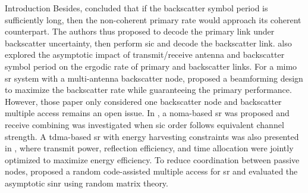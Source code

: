 \documentclass[journal]{IEEEtran}
\begin{document}
\begin{section}{Introduction}
	Besides, \cite{Long2020a} concluded that if the backscatter symbol period is sufficiently long, then the non-coherent primary rate would approach its coherent counterpart.
	The authors thus proposed to decode the primary link under backscatter uncertainty, then perform \gls{sic} and decode the backscatter link.
	\cite{Zhou2019a} also explored the asymptotic impact of transmit/receive antenna and backscatter symbol period on the ergodic rate of primary and backscatter links.
	For a \gls{mimo} \gls{sr} system with a multi-antenna backscatter node, \cite{Wu2021a} proposed a beamforming design to maximize the backscatter rate while guaranteeing the primary performance.
	However, those paper only considered one backscatter node and backscatter multiple access remains an open issue.
	In \cite{Xu2021a}, a \gls{noma}-based \gls{sr} was proposed and receive combining was investigated when \gls{sic} order follows equivalent channel strength.
	A \gls{tdma}-based \gls{sr} with energy harvesting constraints was also presented in \cite{Yang2021a}, where transmit power, reflection efficiency, and time allocation were jointly optimized to maximize energy efficiency.
	To reduce coordination between passive nodes, \cite{Han2021} proposed a random code-assisted multiple access for \gls{sr} and evaluated the asymptotic \gls{sinr} using random matrix theory.


\end{section}
\end{document}
